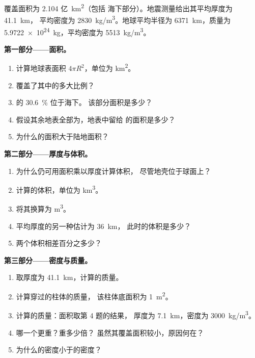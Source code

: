 \begin{problem}
\label{pb:g12:continental-crust:1}
覆盖面积为 2.104 亿~\unit{km^2}（包括
海下部分）。地震测量给出其平均厚度为 \qty{41.1}{km}，
平均密度为 \qty{2830}{kg/m^3}。地球平均半径为
\qty{6371}{km}，质量为 \qty{5.9722e24}{kg}，平均密度为
\qty{5513}{kg/m^3}。

\medskip
\noindent\textbf{第一部分——面积。}
\begin{enumerate}
  \item 计算地球表面积 $4\pi R^2$，单位为
        \unit{km^2}。
  \item {}覆盖了其中的多大比例？
  \item {}的 \qty{30.6}{\percent} 位于海下。
        该部分面积是多少？
  \item 假设其余地表全部为，地表中留给
        的面积是多少？
  \item 为什么的面积大于陆地面积？
\end{enumerate}

\medskip
\noindent\textbf{第二部分——厚度与体积。}
\begin{enumerate}[resume]
  \item 为什么仍可用面积乘以厚度计算体积，
        尽管地壳位于球面上？
  \item 计算的体积，单位为 \unit{km^3}。
  \item 将其换算为 \unit{m^3}。
  \item 平均厚度的另一种估计为 \qty{36}{km}，
        此时的体积是多少？
  \item 两个体积相差百分之多少？
\end{enumerate}

\medskip
\noindent\textbf{第三部分——密度与质量。}
\begin{enumerate}[resume]
  \item 取厚度为 \qty{41.1}{km}，计算的质量。
  \item 计算穿过的柱体的质量，
        该柱体底面积为 \qty{1}{m^2}。
  \item 计算的质量：面积取第 4 题的结果，
        厚度为 \qty{7.1}{km}，密度为 \qty{3000}{kg/m^3}。
  \item 哪一个更重？重多少倍？
        虽然其覆盖面积较小，原因何在？
  \item 为什么的密度小于的密度？
\end{enumerate}


\end{problem}
